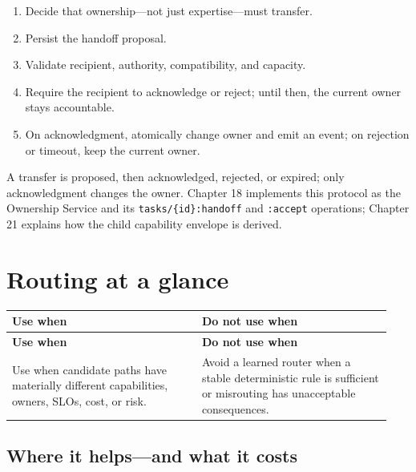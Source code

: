 \begin{enumerate}

\item Decide that ownership—not just expertise—must transfer.

\item Persist the handoff proposal.

\item Validate recipient, authority, compatibility, and capacity.

\item Require the recipient to acknowledge or reject; until then, the current owner stays accountable.

\item On acknowledgment, atomically change owner and emit an event; on rejection or timeout, keep the current owner.

\end{enumerate}

A transfer is proposed, then acknowledged, rejected, or expired; only acknowledgment changes the owner. Chapter 18 implements this protocol as the Ownership Service and its \lstinline[style=bookinline]!tasks/{id}:handoff! and \lstinline[style=bookinline]!:accept! operations; Chapter 21 explains how the child capability envelope is derived.\par

\section{Routing at a glance}

\BookTableStart
\small
\begin{longtable}{@{}Y{0.4700\linewidth}Y{0.4700\linewidth}@{}}
\color{white}\bfseries \textbf{Use when} & \color{white}\bfseries \textbf{Do not use when} \\
\endfirsthead
{}
\color{white}\bfseries \textbf{Use when} & \color{white}\bfseries \textbf{Do not use when} \\
\endhead
Use when candidate paths have materially different capabilities, owners, SLOs, cost, or risk. & Avoid a learned router when a stable deterministic rule is sufficient or misrouting has unacceptable consequences. \\
\end{longtable}
\BookTableEnd

\subsection{Where it helps—and what it costs}

